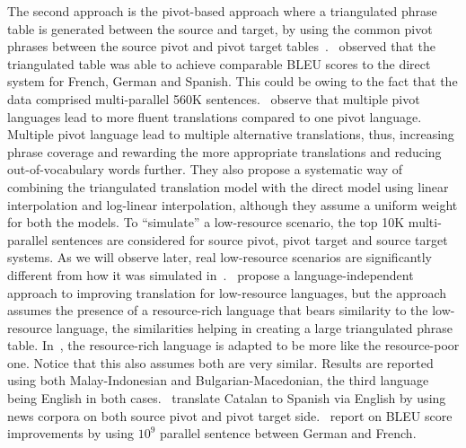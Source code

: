  The second approach is the pivot-based approach where a triangulated phrase table is generated between the source and target, by using the common pivot phrases between the source pivot and pivot target tables~\cite{Utiyama:07,Cohn:07}.~\cite{Utiyama:07} observed that the triangulated table was able to achieve comparable BLEU scores to the direct system for French, German and Spanish. This could be owing to the fact that the data comprised multi-parallel 560K sentences.~\cite{Cohn:07} observe that multiple pivot languages lead to more fluent translations compared to one pivot language. Multiple pivot language lead to multiple alternative translations, thus, increasing phrase coverage and rewarding the more appropriate translations and reducing out-of-vocabulary words further. They also propose a systematic way of combining the triangulated translation model with the direct model using linear interpolation and log-linear interpolation, although they assume a uniform weight for both the models. To ``simulate'' a low-resource scenario, the top 10K multi-parallel sentences are considered for source pivot, pivot target and source target systems. As we will observe later, real low-resource scenarios are significantly different from how it was simulated in~\cite{Cohn:07}.~\cite{Nakov:12} propose a language-independent approach to improving translation for low-resource languages, but the approach assumes the presence of a resource-rich language that bears similarity to the low-resource language, the similarities helping in creating a large triangulated phrase table. In~\cite{Nakovemnlp:12}, the resource-rich language is adapted to be more like the resource-poor one. Notice that this also assumes both are very similar. Results are reported using both Malay-Indonesian and Bulgarian-Macedonian, the third language being English in both cases.~\cite{Gispert:06} translate Catalan to Spanish via English by using news corpora on both source pivot and pivot target side.~\cite{Huck:12} report on BLEU score improvements by using $10^9$ parallel sentence between German and French.

